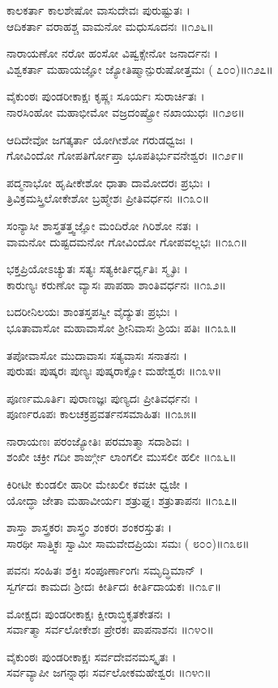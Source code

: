ಕಾಲಕರ್ತಾ ಕಾಲಶೇಷೋ ವಾಸುದೇವಃ ಪುರುಷ್ಟುತಃ ।\\
ಆದಿಕರ್ತಾ ವರಾಹಶ್ಚ ವಾಮನೋ ಮಧುಸೂದನಃ ॥೧೨೬॥

ನಾರಾಯಣೋ ನರೋ ಹಂಸೋ ವಿಷ್ವಕ್ಸೇನೋ ಜನಾರ್ದನಃ ।\\
ವಿಶ್ವಕರ್ತಾ ಮಹಾಯಜ್ಞೋ ಜ್ಯೋತಿಷ್ಮಾನ್ಪುರುಷೋತ್ತಮಃ ( ೭೦೦)॥೧೨೭॥

ವೈಕುಂಠಃ ಪುಂಡರೀಕಾಕ್ಷಃ ಕೃಷ್ಣಃ ಸೂರ್ಯಃ ಸುರಾರ್ಚಿತಃ ।\\
ನಾರಸಿಂಹೋ ಮಹಾಭೀಮೋ ವಜ್ರದಂಷ್ಟ್ರೋ ನಖಾಯುಧಃ ॥೧೨೮॥

ಆದಿದೇವೋ ಜಗತ್ಕರ್ತಾ ಯೋಗೀಶೋ ಗರುಡಧ್ವಜಃ ।\\
ಗೋವಿಂದೋ ಗೋಪತಿರ್ಗೋಪ್ತಾ ಭೂಪತಿರ್ಭುವನೇಶ್ವರಃ ॥೧೨೯॥

ಪದ್ಮನಾಭೋ ಹೃಷೀಕೇಶೋ ಧಾತಾ ದಾಮೋದರಃ ಪ್ರಭುಃ ।\\
ತ್ರಿವಿಕ್ರಮಸ್ತ್ರಿಲೋಕೇಶೋ ಬ್ರಹ್ಮೇಶಃ ಪ್ರೀತಿವರ್ಧನಃ ॥೧೩೦॥

ಸಂನ್ಯಾಸೀ ಶಾಸ್ತ್ರತತ್ತ್ವಜ್ಞೋ ಮಂದಿರೋ ಗಿರಿಶೋ ನತಃ ।\\
ವಾಮನೋ ದುಷ್ಟದಮನೋ ಗೋವಿಂದೋ ಗೋಪವಲ್ಲಭಃ ॥೧೩೧॥

ಭಕ್ತಪ್ರಿಯೋಽಚ್ಯುತಃ ಸತ್ಯಃ ಸತ್ಯಕೀರ್ತಿರ್ಧೃತಿಃ ಸ್ಮೃತಿಃ ।\\
ಕಾರುಣ್ಯಃ ಕರುಣೋ ವ್ಯಾಸಃ ಪಾಪಹಾ ಶಾಂತಿವರ್ಧನಃ ॥೧೩೨॥

ಬದರೀನಿಲಯಃ ಶಾಂತಸ್ತಪಸ್ವೀ ವೈದ್ಯುತಃ ಪ್ರಭುಃ ।\\
ಭೂತಾವಾಸೋ ಮಹಾವಾಸೋ ಶ್ರೀನಿವಾಸಃ ಶ್ರಿಯಃ ಪತಿಃ ॥೧೩೩॥

ತಪೋವಾಸೋ ಮುದಾವಾಸಃ ಸತ್ಯವಾಸಃ ಸನಾತನಃ ।\\
ಪುರುಷಃ ಪುಷ್ಕರಃ ಪುಣ್ಯಃ ಪುಷ್ಕರಾಕ್ಷೋ ಮಹೇಶ್ವರಃ ॥೧೩೪॥

ಪೂರ್ಣಮೂರ್ತಿಃ ಪುರಾಣಜ್ಞಃ ಪುಣ್ಯದಃ ಪ್ರೀತಿವರ್ಧನಃ ।\\
ಪೂರ್ಣರೂಪಃ ಕಾಲಚಕ್ರಪ್ರವರ್ತನಸಮಾಹಿತಃ ॥೧೩೫॥

ನಾರಾಯಣಃ ಪರಂಜ್ಯೋತಿಃ ಪರಮಾತ್ಮಾ ಸದಾಶಿವಃ ।\\
ಶಂಖೀ ಚಕ್ರೀ ಗದೀ ಶಾರ್ಙ್ಗೀ ಲಾಂಗಲೀ ಮುಸಲೀ ಹಲೀ ॥೧೩೬॥

ಕಿರೀಟೀ ಕುಂಡಲೀ ಹಾರೀ ಮೇಖಲೀ ಕವಚೀ ಧ್ವಜೀ ।\\
ಯೋದ್ಧಾ ಜೇತಾ ಮಹಾವೀರ್ಯಃ ಶತ್ರುಘ್ನಃ ಶತ್ರುತಾಪನಃ ॥೧೩೭॥

ಶಾಸ್ತಾ ಶಾಸ್ತ್ರಕರಃ ಶಾಸ್ತ್ರಂ ಶಂಕರಃ ಶಂಕರಸ್ತುತಃ ।\\
ಸಾರಥೀ ಸಾತ್ತ್ವಿಕಃ ಸ್ವಾಮೀ ಸಾಮವೇದಪ್ರಿಯಃ ಸಮಃ ( ೮೦೦)॥೧೩೮॥

ಪವನಃ ಸಂಹಿತಃ ಶಕ್ತಿಃ ಸಂಪೂರ್ಣಾಂಗಃ ಸಮೃದ್ಧಿಮಾನ್ ।\\
ಸ್ವರ್ಗದಃ ಕಾಮದಃ ಶ್ರೀದಃ ಕೀರ್ತಿದಃ ಕೀರ್ತಿದಾಯಕಃ ॥೧೩೯॥

ಮೋಕ್ಷದಃ ಪುಂಡರೀಕಾಕ್ಷಃ ಕ್ಷೀರಾಬ್ಧಿಕೃತಕೇತನಃ ।\\
ಸರ್ವಾತ್ಮಾ ಸರ್ವಲೋಕೇಶಃ ಪ್ರೇರಕಃ ಪಾಪನಾಶನಃ ॥೧೪೦॥

ವೈಕುಂಠಃ ಪುಂಡರೀಕಾಕ್ಷಃ ಸರ್ವದೇವನಮಸ್ಕೃತಃ ।\\
ಸರ್ವವ್ಯಾಪೀ ಜಗನ್ನಾಥಃ ಸರ್ವಲೋಕಮಹೇಶ್ವರಃ ॥೧೪೧॥

